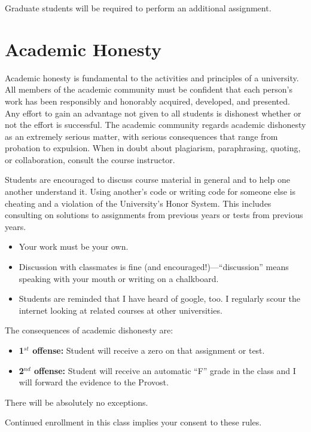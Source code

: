 \documentclass[11pt]{article}
\begin{document}
Graduate students will be required to perform an additional assignment.

\section{Academic Honesty	}

Academic honesty is fundamental to the activities and principles of a university. All members of the academic community must be confident that each person's work has been responsibly and honorably acquired, developed, and presented. Any effort to gain an advantage not given to all students is dishonest whether or not the effort is successful. The academic community regards academic dishonesty as an extremely serious matter, with serious consequences that range from probation to expulsion. When in doubt about plagiarism, paraphrasing, quoting, or collaboration, consult the course instructor. 
	
	Students are encouraged to discuss course material in general and to help one another understand it. Using another's code or writing code for someone else is cheating and a violation of the University's Honor System. This includes consulting on solutions to assignments from previous years or tests from previous years. 
\begin{itemize}
\item Your work must be your own. 
\item Discussion with classmates is fine (and encouraged!)---``discussion'' means speaking with your mouth or writing on a chalkboard.
\item Students are reminded that I have heard of google, too. I regularly scour the internet looking at related courses at other universities.
\end{itemize}

The consequences of academic dishonesty are:
\begin{itemize}
\item[] {\bf 1$^{st}$ offense:} Student will receive a zero on that assignment or test.
\item[] {\bf 2$^{nd}$ offense:} Student will receive an automatic “F” grade in the class and I will forward the evidence to the Provost.
\end{itemize}
There will be absolutely no exceptions.

Continued enrollment in this class implies your consent to these rules.
\end{document}
